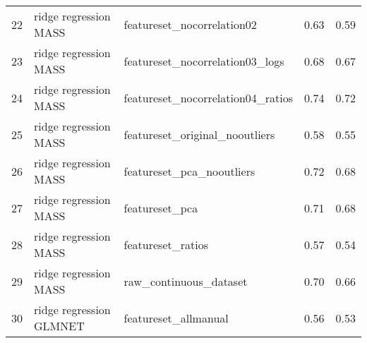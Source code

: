 \begin{tabular}{cllcc}
  22 & ridge regression MASS & featureset\_nocorrelation02 & 0.63 & 0.59 \\ 
  23 & ridge regression MASS & featureset\_nocorrelation03\_logs & 0.68 & 0.67 \\ 
  24 & ridge regression MASS & featureset\_nocorrelation04\_ratios & 0.74 & 0.72 \\ 
  25 & ridge regression MASS & featureset\_original\_nooutliers & 0.58 & 0.55 \\ 
  26 & ridge regression MASS & featureset\_pca\_nooutliers & 0.72 & 0.68 \\ 
  27 & ridge regression MASS & featureset\_pca & 0.71 & 0.68 \\ 
  28 & ridge regression MASS & featureset\_ratios & 0.57 & 0.54 \\ 
  29 & ridge regression MASS & raw\_continuous\_dataset & 0.70 & 0.66 \\ 
  30 & ridge regression GLMNET & featureset\_allmanual & 0.56 & 0.53 \\ 
     \hline
\end{tabular}

